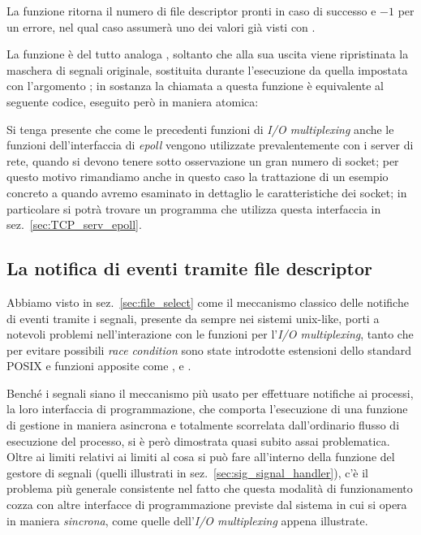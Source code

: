 \begin{funcproto}{

  }

{La funzione ritorna il numero di file descriptor pronti in caso di successo e
  $-1$ per un errore, nel qual caso  assumerà uno dei valori già
  visti con .

}  
\end{funcproto}

La funzione è del tutto analoga , soltanto che alla sua
uscita viene ripristinata la maschera di segnali originale, sostituita durante
l'esecuzione da quella impostata con l'argomento ; in sostanza
la chiamata a questa funzione è equivalente al seguente codice, eseguito però
in maniera atomica:

Si tenga presente che come le precedenti funzioni di \textit{I/O multiplexing}
anche le funzioni dell'interfaccia di \textit{epoll} vengono utilizzate
prevalentemente con i server di rete, quando si devono tenere sotto
osservazione un gran numero di socket; per questo motivo rimandiamo anche in
questo caso la trattazione di un esempio concreto a quando avremo esaminato in
dettaglio le caratteristiche dei socket; in particolare si potrà trovare un
programma che utilizza questa interfaccia in sez.~\ref{sec:TCP_serv_epoll}.



\subsection{La notifica di eventi tramite file descriptor}
\label{sec:sig_signalfd_eventfd}

Abbiamo visto in sez.~\ref{sec:file_select} come il meccanismo classico delle
notifiche di eventi tramite i segnali, presente da sempre nei sistemi
unix-like, porti a notevoli problemi nell'interazione con le funzioni per
l'\textit{I/O multiplexing}, tanto che per evitare possibili \textit{race
  condition} sono state introdotte estensioni dello standard POSIX e funzioni
apposite come ,  e .

Benché i segnali siano il meccanismo più usato per effettuare notifiche ai
processi, la loro interfaccia di programmazione, che comporta l'esecuzione di
una funzione di gestione in maniera asincrona e totalmente scorrelata
dall'ordinario flusso di esecuzione del processo, si è però dimostrata quasi
subito assai problematica. Oltre ai limiti relativi ai limiti al cosa si può
fare all'interno della funzione del gestore di segnali (quelli illustrati in
sez.~\ref{sec:sig_signal_handler}), c'è il problema più generale consistente
nel fatto che questa modalità di funzionamento cozza con altre interfacce di
programmazione previste dal sistema in cui si opera in maniera
\textsl{sincrona}, come quelle dell'\textit{I/O multiplexing} appena
illustrate.

